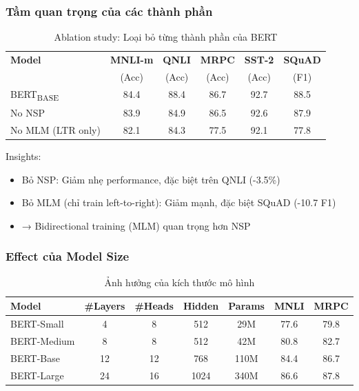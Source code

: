 \subsubsection{Tầm quan trọng của các thành phần}
\begin{table}[H]
    \centering
    \caption{Ablation study: Loại bỏ từng thành phần của BERT}
    \label{tab:ablation_components}
    \begin{tabular}{lccccc}
        \toprule
        \textbf{Model} & \textbf{MNLI-m} & \textbf{QNLI} & \textbf{MRPC} & \textbf{SST-2} & \textbf{SQuAD} \\
        & (Acc) & (Acc) & (Acc) & (Acc) & (F1) \\
        \midrule
        BERT\textsubscript{BASE} & 84.4 & 88.4 & 86.7 & 92.7 & 88.5 \\
        \midrule
        No NSP & 83.9 & 84.9 & 86.5 & 92.6 & 87.9 \\
        No MLM (LTR only) & 82.1 & 84.3 & 77.5 & 92.1 & 77.8 \\
        \bottomrule
    \end{tabular}
\end{table}

Insights:
\begin{itemize}
    \item Bỏ NSP: Giảm nhẹ performance, đặc biệt trên QNLI (-3.5\%)
    \item Bỏ MLM (chỉ train left-to-right): Giảm mạnh, đặc biệt SQuAD (-10.7 F1)
    \item → Bidirectional training (MLM) quan trọng hơn NSP
\end{itemize}

\subsubsection{Effect của Model Size}
\begin{table}[H]
    \centering
    \caption{Ảnh hưởng của kích thước mô hình}
    \label{tab:model_size_effect}
    \begin{tabular}{lcccccc}
        \toprule
        \textbf{Model} & \textbf{\#Layers} & \textbf{\#Heads} & \textbf{Hidden} & \textbf{Params} & \textbf{MNLI} & \textbf{MRPC} \\
        \midrule
        BERT-Small & 4 & 8 & 512 & 29M & 77.6 & 79.8 \\
        BERT-Medium & 8 & 8 & 512 & 42M & 80.8 & 82.7 \\
        BERT-Base & 12 & 12 & 768 & 110M & 84.4 & 86.7 \\
        BERT-Large & 24 & 16 & 1024 & 340M & 86.6 & 87.8 \\
        \bottomrule
    \end{tabular}
\end{table}

